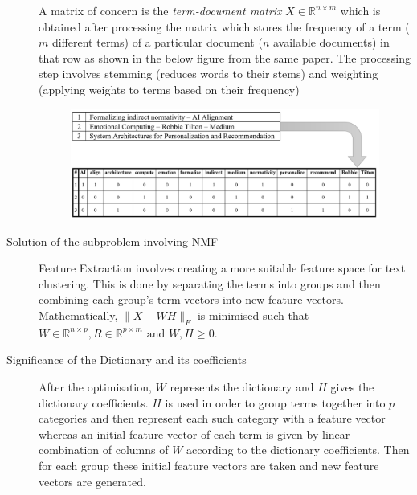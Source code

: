 \documentclass[a4paper]{article}
\begin{document}
\begin{description}
	A matrix of concern is the \emph{term-document matrix} $X \in \mathbb{R}^{n\times m}$ which is obtained after processing the matrix which stores the frequency of a term ($m$ different terms) of a particular document ($n$ available documents) in that row as shown in the below figure from the same paper. The processing step involves stemming (reduces words to their stems) and weighting (applying weights to terms based on their frequency)
	\begin{figure}[H]
	\centering
	\includegraphics[width=\linewidth]{../media/Q3 count matrix.png}
	\end{figure}
	\item[Solution of the subproblem involving NMF] Feature Extraction involves creating a more suitable feature space for text clustering. This is done by separating the terms into groups and then combining each group's term vectors into new feature vectors.
	Mathematically, $\|X-WH\|_F$ is minimised such that $W\in\mathbb{R}^{n\times p}, R\in\mathbb{R}^{p\times m}\text{ and }W,H \geq 0$.
	\item[Significance of the Dictionary and its coefficients] 
	After the optimisation, $W$ represents the dictionary and $H$ gives the dictionary coefficients. $H$ is used in order to group terms together into $p$ categories and then represent each such category with a feature vector whereas an initial feature vector of each term is given by linear combination of columns of $W$ according to the dictionary coefficients. Then for each group these initial feature vectors are taken and new feature vectors are generated.
\end{description}
\end{document}
